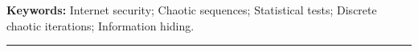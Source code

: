 \documentclass[a4paper,11pt,twoside]{ThesisStyle}
\begin{document}
\begin{vcenterpage}
{\large\textbf{Keywords:}}
Internet security; Chaotic sequences; Statistical tests; Discrete chaotic iterations; Information hiding.
\\
\noindent\rule[2pt]{\textwidth}{0.5pt}
\end{vcenterpage}
\end{document}

